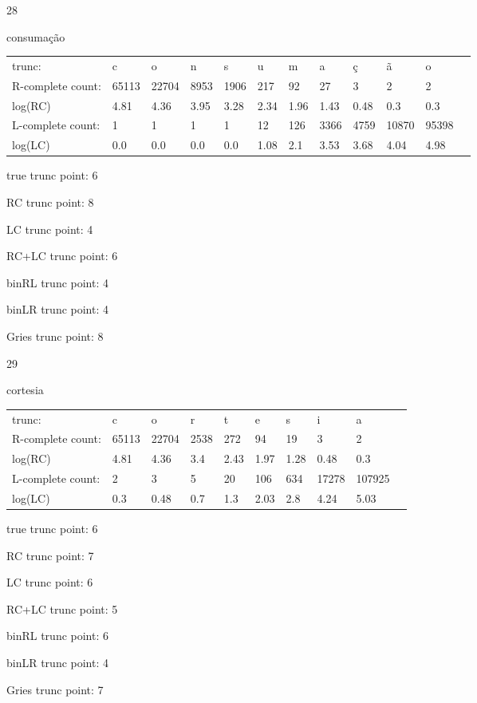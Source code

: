 \documentclass[10pt]{article}
\begin{document}
28

consumação

\begin{tabular}{l|lllllllllll}
trunc: & c & o & n & s & u & m & a & ç & ã & o & \\ 
R-complete count: & 65113 & 22704 & 8953 & 1906 & 217 & 92 & 27 & 3 & 2 & 2 & \\ 
log(RC) & 4.81 & 4.36 & 3.95 & 3.28 & 2.34 & 1.96 & 1.43 & 0.48 & 0.3 & 0.3 & \\ 
L-complete count: & 1 & 1 & 1 & 1 & 12 & 126 & 3366 & 4759 & 10870 & 95398 & \\ 
log(LC) & 0.0 & 0.0 & 0.0 & 0.0 & 1.08 & 2.1 & 3.53 & 3.68 & 4.04 & 4.98 & \\ 
\end{tabular}

true trunc point: 6

RC trunc point: 8

LC trunc point: 4

RC+LC trunc point: 6

binRL trunc point: 4

binLR trunc point: 4

Gries trunc point: 8

\newpage

29

cortesia

\begin{tabular}{l|lllllllll}
trunc: & c & o & r & t & e & s & i & a & \\ 
R-complete count: & 65113 & 22704 & 2538 & 272 & 94 & 19 & 3 & 2 & \\ 
log(RC) & 4.81 & 4.36 & 3.4 & 2.43 & 1.97 & 1.28 & 0.48 & 0.3 & \\ 
L-complete count: & 2 & 3 & 5 & 20 & 106 & 634 & 17278 & 107925 & \\ 
log(LC) & 0.3 & 0.48 & 0.7 & 1.3 & 2.03 & 2.8 & 4.24 & 5.03 & \\ 
\end{tabular}

true trunc point: 6

RC trunc point: 7

LC trunc point: 6

RC+LC trunc point: 5

binRL trunc point: 6

binLR trunc point: 4

Gries trunc point: 7

\vspace{1em}
\end{document}
